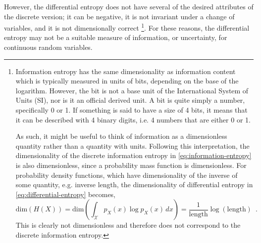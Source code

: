 However, the differential entropy does not have several of the desired attributes of the discrete version; it can be negative, it is not invariant under a change of variables, and it is not dimensionally correct%
\footnote{
    Information entropy has the same dimensionality as information content which is typically measured in units of bits, depending on the base of the logarithm. 
    However, the bit is not a base unit of the International System of Units (SI), nor is it an official derived unit.
    A bit is quite simply a number, specifically 0 or 1. If something is said to have a size of 4 bits, it means that it can be described with 4 binary digits, i.e. 4 numbers that are either 0 or 1.

    As such, it might be useful to think of information as a dimensionless quantity rather than a quantity with units.
    Following this interpretation, the dimensionality of the discrete information entropy in \cref{eq:information-entropy} is also dimensionless, since a probability mass function is dimensionless. 
    For probability density functions, which have dimensionality of the inverse of some quantity, e.g. inverse length, the dimensionality of differential entropy in \cref{eq:differential-entropy} becomes,
    \begin{equation}
        \text{dim} \left( H(X) \right) = \text{dim} \left( \int_{\mathcal{X}} p_X(x) \log p_X(x) \, dx \right) = \frac{1}{\text{length}} \log\left(\text{length}\right) \enspace .
    \end{equation}
    This is clearly not dimensionless and therefore does not correspond to the discrete information entropy.
    
}. 
For these reasons, the differential entropy may not be a suitable measure of information, or uncertainty, for continuous random variables. 

